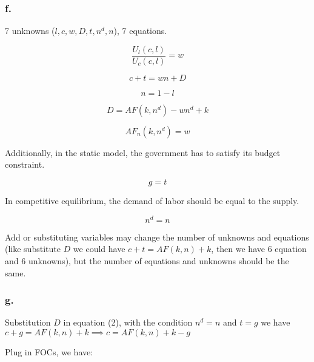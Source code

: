 \documentclass{article}
\begin{document}
\subsubsection*{\textrm{f.}}

7 unknowns ($l,c,w,D,t,n^{d}, n$), 7 equations.

\begin{equation}
    \dfrac{U_{l}\left(c,l\right)}{U_{c}\left(c,l\right)}=w
\end{equation}

\begin{equation}
    c+t=wn+D
\end{equation}

\begin{equation}
    n=1-l
\end{equation}

\begin{equation}
    D=AF\left(k,n^{d}\right)-wn^{d}+k
\end{equation}

\begin{equation}
    AF_{n}\left(k, n^{d}\right)=w
\end{equation}

Additionally, in the static model, the government has to satisfy its budget constraint.

\begin{equation}
    g=t
\end{equation}

In competitive equilibrium, the demand of labor should be equal to the supply.

\begin{equation}
    n^{d}=n
\end{equation}

Add or substituting variables may change the number of unknowns and equations (like substitute $D$ we could have $c+t=AF\left(k,n\right)+k$, then we have 6 equation and 6 unknowns), but the number of equations and unknowns should be the same.

\subsubsection*{\textrm{g.}}

Substitution $D$ in equation (2), with the condition $n^{d}=n$ and $t=g$ we have $c+g=AF\left(k,n\right)+k\implies c=AF\left(k,n\right)+k-g$

Plug in FOCs, we have: \\
\end{document}
